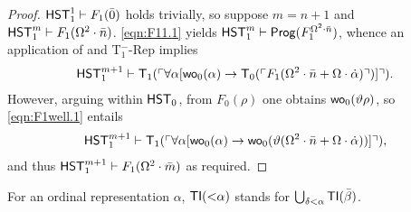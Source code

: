 \documentclass[UKenglish,cleveref,DIV=12]{scrartcl}
\theoremstyle{definition}
\theoremstyle{definition}
\begin{document}
\begin{proof}
$\mathsf{HST}_1^1\vdash F_1(\bar 0)$ holds trivially, so suppose $m=n+1$ and $\mathsf{HST}_1^m\vdash F_1(\Omega^2\cdot\bar n)$.
\eqref{eqn:F11.1} yields $\mathsf{HST}_1^m\vdash \mathsf{Prog} ( F_1^{\Omega^2\cdot\bar n})$, whence an application of  and T$^-_1$-Rep implies
\begin{align}\label{eqn:F1well.1}
  \mathsf{HST}_1^{m+1}\vdash \mathsf{T}_1(\ulcorner{\forall\alpha[\mathsf{wo}_0(\alpha)\rightarrow \mathsf{T}_0(\ulcorner{F_1(\Omega^2\cdot\bar n+\Omega\cdot\dot\alpha)}\urcorner)]}\urcorner).
\end{align}
However, arguing within $\mathsf{HST}_0$, from $F_0(\rho)$ one obtains $\mathsf{wo}_0(\vartheta\rho)$, so \eqref{eqn:F1well.1} entails
\begin{align*}
  \mathsf{HST}_1^{m+1}\vdash \mathsf{T}_1(\ulcorner{\forall\alpha[\mathsf{wo}_0(\alpha)\rightarrow \mathsf{wo}_0(\vartheta(\Omega^2\cdot\bar n+\Omega\cdot \dot\alpha))]}\urcorner),
\end{align*}
and thus $\mathsf{HST}_1^{m+1}\vdash F_1(\Omega^2\cdot\bar m)$ as required.
\end{proof}

For an ordinal representation $\alpha$, $\mathsf{TI}(\mathord<\alpha)$ stands for $\bigcup_{\delta<\alpha}\mathsf{TI}(\bar\beta)$.
\end{document}
